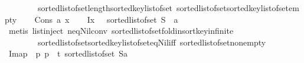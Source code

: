 \begin{isabellebody}
\ \ \ \ \ \ \ \ sorted{\isacharunderscore}{\kern0pt}list{\isacharunderscore}{\kern0pt}of{\isacharunderscore}{\kern0pt}set{\isachardot}{\kern0pt}length{\isacharunderscore}{\kern0pt}sorted{\isacharunderscore}{\kern0pt}key{\isacharunderscore}{\kern0pt}list{\isacharunderscore}{\kern0pt}of{\isacharunderscore}{\kern0pt}set\ sorted{\isacharunderscore}{\kern0pt}list{\isacharunderscore}{\kern0pt}of{\isacharunderscore}{\kern0pt}set{\isachardot}{\kern0pt}sorted{\isacharunderscore}{\kern0pt}key{\isacharunderscore}{\kern0pt}list{\isacharunderscore}{\kern0pt}of{\isacharunderscore}{\kern0pt}set{\isacharunderscore}{\kern0pt}empty{\isacharparenright}{\kern0pt}\isanewline
{}\isamarkupfalse%
\isanewline
\ \ \isamarkupfalse%
\ {\isacharparenleft}{\kern0pt}Cons\ a\ x{\isacharparenright}{\kern0pt}\isanewline
\ \ \isamarkupfalse%
\ I{}{\isacharcolon}{\kern0pt}{\isachardoublequoteopen}x\ \ {\isacharequal}{\kern0pt}\ sorted{\isacharunderscore}{\kern0pt}list{\isacharunderscore}{\kern0pt}of{\isacharunderscore}{\kern0pt}set\ {\isacharparenleft}{\kern0pt}S\ {\isacharminus}{\kern0pt}\ {\isacharbraceleft}{\kern0pt}a{\isacharbraceright}{\kern0pt}{\isacharparenright}{\kern0pt}{\isachardoublequoteclose}\isanewline
\ \ \ \ \isamarkupfalse%
\ {\isacharparenleft}{\kern0pt}metis\ list{\isachardot}{\kern0pt}inject\ neq{\isacharunderscore}{\kern0pt}Nil{\isacharunderscore}{\kern0pt}conv\ sorted{\isacharunderscore}{\kern0pt}list{\isacharunderscore}{\kern0pt}of{\isacharunderscore}{\kern0pt}set{\isachardot}{\kern0pt}fold{\isacharunderscore}{\kern0pt}insort{\isacharunderscore}{\kern0pt}key{\isachardot}{\kern0pt}infinite\isanewline
\ \ \ \ \ \ \ \ sorted{\isacharunderscore}{\kern0pt}list{\isacharunderscore}{\kern0pt}of{\isacharunderscore}{\kern0pt}set{\isachardot}{\kern0pt}sorted{\isacharunderscore}{\kern0pt}key{\isacharunderscore}{\kern0pt}list{\isacharunderscore}{\kern0pt}of{\isacharunderscore}{\kern0pt}set{\isacharunderscore}{\kern0pt}eq{\isacharunderscore}{\kern0pt}Nil{\isacharunderscore}{\kern0pt}iff\ sorted{\isacharunderscore}{\kern0pt}list{\isacharunderscore}{\kern0pt}of{\isacharunderscore}{\kern0pt}set{\isacharunderscore}{\kern0pt}nonempty{\isacharparenright}{\kern0pt}\isanewline
\ \ \isamarkupfalse%
\ I{}{\isacharcolon}{\kern0pt}{\isachardoublequoteopen}map\ {\isacharparenleft}{\kern0pt}{\isasymlambda}\ p{\isachardot}{\kern0pt}\ p\ {\isacharplus}{\kern0pt}\ t{\isacharparenright}{\kern0pt}\ {\isacharparenleft}{\kern0pt}sorted{\isacharunderscore}{\kern0pt}list{\isacharunderscore}{\kern0pt}of{\isacharunderscore}{\kern0pt}set\ {\isacharparenleft}{\kern0pt}S{\isacharminus}{\kern0pt}{\isacharbraceleft}{\kern0pt}a{\isacharbraceright}{\kern0pt}{\isacharparenright}{\kern0pt}{\isacharparenright}{\kern0pt}\ {\isacharequal}{\kern0pt}\ \isanewline

\end{isabellebody}
